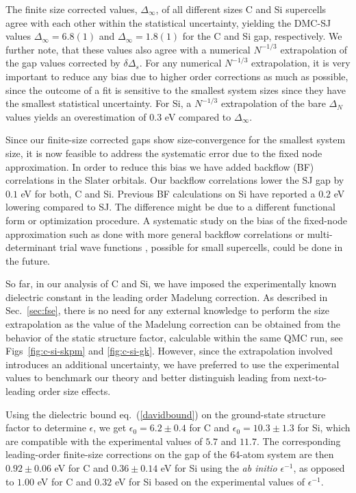 The finite size corrected values, $\Delta_\infty$, of all different sizes C and Si supercells agree with
each other within the statistical uncertainty, yielding the DMC-SJ values $\Delta_\infty=6.8(1)$
and  $\Delta_\infty=1.8(1)$ for the C and Si gap, respectively. 
We further note, that these values also agree with a numerical
$N^{-1/3}$ extrapolation of the gap values corrected by $\delta \Delta_s$. For any numerical
$N^{-1/3}$ extrapolation, it is very important to reduce any bias due to higher order corrections
as much as possible, since the outcome of a fit is sensitive to the smallest system sizes
since they have the smallest statistical uncertainty. For Si,
a $N^{-1/3}$ extrapolation
of the bare $\Delta_N$ values yields an overestimation of $0.3$ eV compared to $\Delta_\infty$.

Since our finite-size corrected gaps show size-convergence for the smallest system size,
it is now feasible to address the systematic error due to the fixed node approximation.
In order to reduce this bias
we have added backflow (BF) correlations in the Slater orbitals. Our backflow correlations lower
the SJ gap by $0.1$ eV for both, C and Si.
Previous BF calculations \cite{Hunt} on Si have reported a $0.2$ eV lowering compared to SJ.
The difference might be due to a different functional form or optimization procedure.
A systematic study on the bias of the fixed-node approximation such as done with more general backflow correlations \cite{BFN,orbitalbf} or
multi-determinant trial wave functions \cite{Zhao19}, possible for small supercells,
could be done in the future.

So far, in our analysis of C and Si, we have imposed the experimentally known dielectric constant
in the leading order Madelung correction. As described in Sec.~\ref{sec:fse},
there is no need for any external knowledge to perform the size extrapolation as the value
of the Madelung correction can be obtained from the behavior of the static structure factor,
calculable within the same QMC run, see  Figs~\ref{fig:c-si-skpm} and \ref{fig:c-si-gk}. However, since
 the extrapolation involved introduces an additional uncertainty, we have preferred to use
the experimental values to benchmark our theory and better distinguish leading
from next-to-leading order size effects. 

Using the dielectric bound eq.~(\ref{davidbound}) on the ground-state structure factor to determine $\epsilon$, we get $\epsilon_0=6.2\pm0.4$ for C and $\epsilon_0=10.3\pm1.3$ for Si, which are compatible with the experimental values of $5.7$ and $11.7$. The corresponding leading-order finite-size corrections on the gap of the 64-atom system are then $0.92\pm0.06$ eV for C and $0.36\pm0.14$ eV for Si using the \emph{ab initio} $\epsilon^{-1}$, as opposed to $1.00$ eV for C and $0.32$ eV for Si based on the experimental values of $\epsilon^{-1}$.

